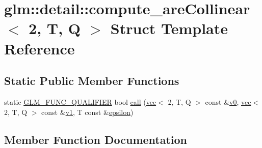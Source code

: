 \hypertarget{structglm_1_1detail_1_1compute__are_collinear_3_012_00_01_t_00_01_q_01_4}{}\section{glm\+:\+:detail\+:\+:compute\+\_\+are\+Collinear$<$ 2, T, Q $>$ Struct Template Reference}
\label{structglm_1_1detail_1_1compute__are_collinear_3_012_00_01_t_00_01_q_01_4}
\subsection*{Static Public Member Functions}
\begin{DoxyCompactItemize}
\item 
static \mbox{\hyperlink{setup_8hpp_a33fdea6f91c5f834105f7415e2a64407}{G\+L\+M\+\_\+\+F\+U\+N\+C\+\_\+\+Q\+U\+A\+L\+I\+F\+I\+ER}} bool \mbox{\hyperlink{structglm_1_1detail_1_1compute__are_collinear_3_012_00_01_t_00_01_q_01_4_a4a32a093975dd49210dafdcb0be3b108}{call}} (\mbox{\hyperlink{structglm_1_1vec}{vec}}$<$ 2, T, Q $>$ const \&\mbox{\hyperlink{_s_d_l__opengl__glext_8h_a7062a23d1d434121d4a88f530703d06a}{v0}}, \mbox{\hyperlink{structglm_1_1vec}{vec}}$<$ 2, T, Q $>$ const \&\mbox{\hyperlink{_s_d_l__opengl__glext_8h_a435c176a02c061b43e19bdf7c86cceae}{v1}}, T const \&\mbox{\hyperlink{group__gtc__constants_ga2a1e57fc5592b69cfae84174cbfc9429}{epsilon}})
\end{DoxyCompactItemize}


\subsection{Member Function Documentation}
\mbox{\label{structglm_1_1detail_1_1compute__are_collinear_3_012_00_01_t_00_01_q_01_4_a4a32a093975dd49210dafdcb0be3b108}} 
